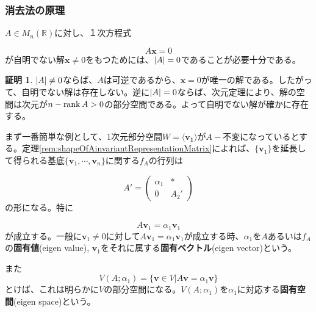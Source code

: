 \documentclass[dvipdfmx,autodetect-engine]{jsarticle}
\theoremstyle{definition}
\newtheorem*{Proof*}{証明}
\newcommand{\rank}[1]{{\rm rank}\,#1}
\DeclarePairedDelimiter{\abs}{\lvert}{\rvert}
\begin{document}
\subsubsection{消去法の原理}

$A \in M_n(\mathbb{R})$に対し、１次方程式

$$
A\bm{x} = 0
$$
が自明でない解$\bm{x} \neq 0$をもつためには、$\abs{A} = 0$であることが必要十分である。
\begin{Proof*}
$\abs{A} \neq 0$ならば、$A$は可逆であるから、$\bm{x} = 0$が唯一の解である。したがって、自明でない解は存在しない。逆に$\abs{A} = 0$ならば、次元定理により、解の空間は次元が$n - \rank A > 0$の部分空間である。よって自明でない解が確かに存在する。
\end{Proof*}
 


まず一番簡単な例として、1次元部分空間$W = \langle \bm{v_1} \rangle$が$A-不変$になっているとする。定理\ref{rem:shapeOfAinvariantRepresentationMatrix}によれば、$\{\bm{v}_1\}$を延長して得られる基底$\{\bm{v}_1, \cdots, \bm{v}_n\}$に関する$f_A$の行列は

$$
A' = \begin{pmatrix}
\alpha_1 & \ast \\
0 & A_2'
\end{pmatrix}
$$
の形になる。特に

$$
A\bm{v}_1 = \alpha_1\bm{v}_1
$$
が成立する。一般に$\bm{v}_1 \neq 0$に対して$A\bm{v}_1 = \alpha_1\bm{v}_1$が成立する時、$\alpha_1$を$A$あるいは$f_A$の{\bf 固有値}(eigen value), $\bm{v}_1$をそれに属する{\bf 固有ベクトル}(eigen vector)という。

また
$$
V(A;\alpha_1) = \{\bm{v} \in V | A\bm{v} = \alpha_1\bm{v}\}
$$
とけば、これは明らかに$V$の部分空間になる。$V(A;\alpha_1)$を$\alpha_1$に対応する{\bf 固有空間}(eigen space)という。

\end{document}

